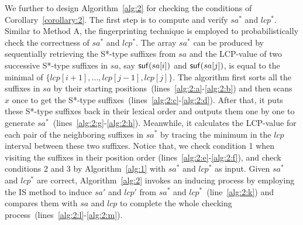 \documentclass[10pt,journal,compsoc]{IEEEtran}
\begin{document}
We further to design Algorithm~\ref{alg:2} for checking the conditions of Corollary~\ref{corollary:2}. The first step is to compute and verify $sa^*$ and $lcp^*$. Similar to Method A, the fingerprinting technique is employed to probabilistically check the correctness of $sa^*$ and $lcp^*$.  The array $sa^*$ can be produced by sequentially retrieving the S*-type suffixes from $sa$ and the LCP-value of two successive S*-type suffixes in $sa$, say ${\sf suf}(sa[i])$ and ${\sf suf}(sa[j])$, is equal to the minimal of $\{lcp[i + 1], ..., lcp[j - 1], lcp[j]\}$. The algorithm first sorts all the suffixes in $sa$ by their starting positions~(lines~\ref{alg:2:a}-\ref{alg:2:b}) and then scans $x$ once to get the S*-type suffixes~(lines~\ref{alg:2:c}-\ref{alg:2:d}). After that, it puts these S*-type suffixes back in their lexical order and outputs them one by one to generate $sa^*$~(lines~\ref{alg:2:g}-\ref{alg:2:h}). Meanwhile, it calculates the LCP-value for each pair of the neighboring suffixes in $sa^*$ by tracing the minimum in the $lcp$ interval between these two suffixes. Notice that, we check condition 1 when visiting the suffixes in their position order (lines~\ref{alg:2:e}-\ref{alg:2:f}), and check conditions 2 and 3 by Algorithm~\ref{alg:1} with $sa^*$ and $lcp^*$ as input. Given $sa^*$ and $lcp^*$ are correct, 
Algorithm~\ref{alg:2} invokes an inducing process by employing the IS method to induce $sa'$ and $lcp'$ from $sa^*$ and $lcp^*$~(line~\ref{alg:2:k}) and compares them with $sa$ and $lcp$ to complete the whole checking process~(lines~\ref{alg:2:l}-\ref{alg:2:m}).
\end{document}
